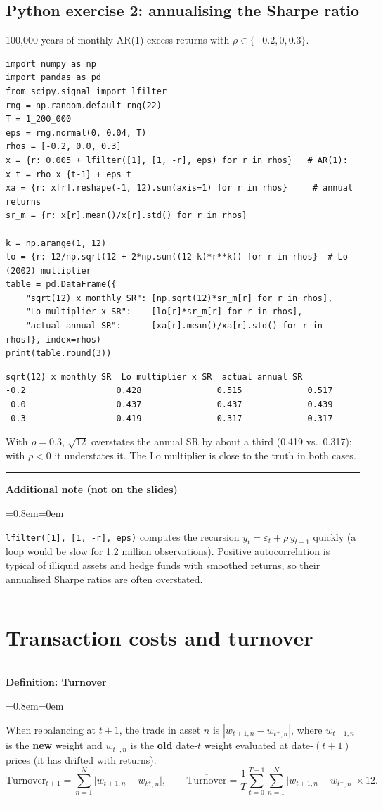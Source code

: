 \documentclass[11pt,a4paper]{report}
\newenvironment{notebox}[1]
  {\par\medskip\Needspace{6\baselineskip}\noindent\rule{\linewidth}{0.4pt}\par\nopagebreak
   \noindent\textbf{#1}\par\nopagebreak
   \begin{list}{}{\leftmargin=0.8em\rightmargin=0em\topsep=2pt}\item[]}
  {\end{list}\nopagebreak\noindent\rule{\linewidth}{0.4pt}\par\medskip}
\newenvironment{definitionbox}[1]{\begin{notebox}{Definition: #1}}{\end{notebox}}
\newenvironment{addnote}{\begin{notebox}{Additional note (not on the slides)}}{\end{notebox}}
\begin{document}
\subsection*{Python exercise 2: annualising the Sharpe ratio}
100{,}000 years of monthly AR(1) excess returns with $\rho\in\{-0.2,0,0.3\}$.
\begin{lstlisting}
import numpy as np
import pandas as pd
from scipy.signal import lfilter
rng = np.random.default_rng(22)
T = 1_200_000
eps = rng.normal(0, 0.04, T)
rhos = [-0.2, 0.0, 0.3]
x = {r: 0.005 + lfilter([1], [1, -r], eps) for r in rhos}   # AR(1): x_t = rho x_{t-1} + eps_t
xa = {r: x[r].reshape(-1, 12).sum(axis=1) for r in rhos}     # annual returns
sr_m = {r: x[r].mean()/x[r].std() for r in rhos}

k = np.arange(1, 12)
lo = {r: 12/np.sqrt(12 + 2*np.sum((12-k)*r**k)) for r in rhos}  # Lo (2002) multiplier
table = pd.DataFrame({
    "sqrt(12) x monthly SR": [np.sqrt(12)*sr_m[r] for r in rhos],
    "Lo multiplier x SR":    [lo[r]*sr_m[r] for r in rhos],
    "actual annual SR":      [xa[r].mean()/xa[r].std() for r in rhos]}, index=rhos)
print(table.round(3))
\end{lstlisting}
\begin{lstlisting}[style=out]
      sqrt(12) x monthly SR  Lo multiplier x SR  actual annual SR
-0.2                  0.428               0.515             0.517
 0.0                  0.437               0.437             0.439
 0.3                  0.419               0.317             0.317
\end{lstlisting}
With $\rho=0.3$, $\sqrt{12}$ overstates the annual SR by about a third
(0.419 vs.\ 0.317); with $\rho<0$ it understates it. The Lo multiplier is close
to the truth in both cases.

\begin{addnote}
\texttt{lfilter([1], [1, -r], eps)} computes the recursion
$y_t=\varepsilon_t+\rho\,y_{t-1}$ quickly (a loop would be slow for 1.2 million
observations). Positive autocorrelation is typical of illiquid assets and hedge
funds with smoothed returns, so their annualised Sharpe ratios are often
overstated.
\end{addnote}

\section{Transaction costs and turnover}

\begin{definitionbox}{Turnover}
When rebalancing at $t+1$, the trade in asset $n$ is $|w_{t+1,n}-w_{t^+,n}|$, where
$w_{t+1,n}$ is the \textbf{new} weight and $w_{t^+,n}$ is the \textbf{old} date-$t$
weight evaluated at date-$(t+1)$ prices (it has drifted with returns).
\[
\text{Turnover}_{t+1}=\sum_{n=1}^N\big|w_{t+1,n}-w_{t^+,n}\big|,\qquad
\overline{\text{Turnover}}=\frac1T\sum_{t=0}^{T-1}\sum_{n=1}^N\big|w_{t+1,n}-w_{t^+,n}\big|\times12 .
\]
\end{definitionbox}
\end{document}
